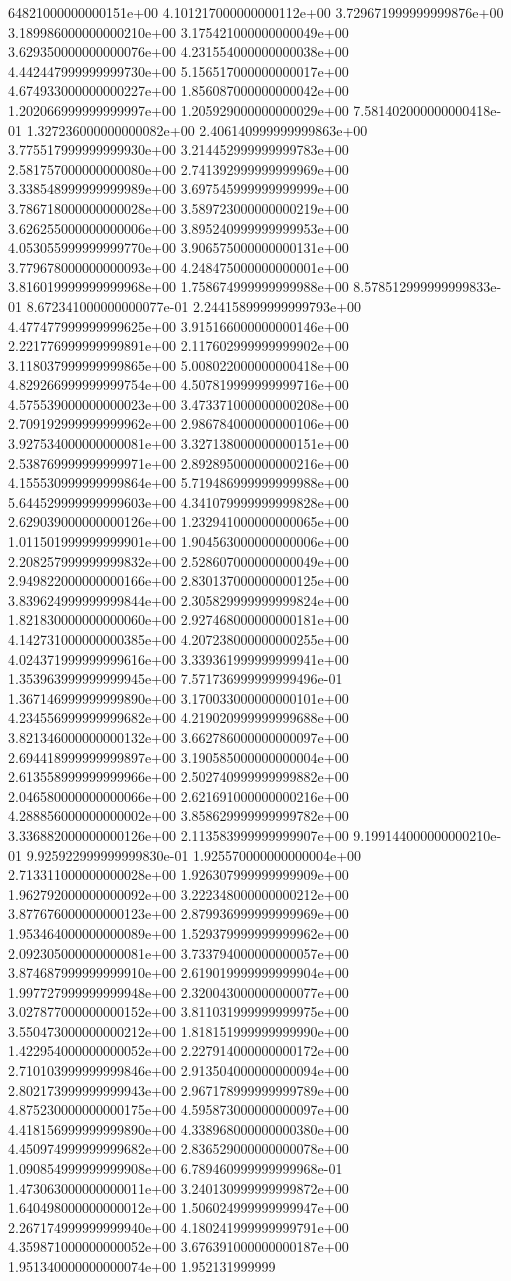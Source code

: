 64821000000000151e+00	4.101217000000000112e+00	3.729671999999999876e+00	3.189986000000000210e+00	3.175421000000000049e+00	3.629350000000000076e+00	4.231554000000000038e+00	4.442447999999999730e+00	5.156517000000000017e+00	4.674933000000000227e+00	1.856087000000000042e+00	1.202066999999999997e+00	1.205929000000000029e+00	7.581402000000000418e-01	1.327236000000000082e+00	2.406140999999999863e+00	3.775517999999999930e+00	3.214452999999999783e+00	2.581757000000000080e+00	2.741392999999999969e+00	3.338548999999999989e+00	3.697545999999999999e+00	3.786718000000000028e+00	3.589723000000000219e+00	3.626255000000000006e+00	3.895240999999999953e+00	4.053055999999999770e+00	3.906575000000000131e+00	3.779678000000000093e+00	4.248475000000000001e+00	3.816019999999999968e+00	1.758674999999999988e+00	8.578512999999999833e-01	8.672341000000000077e-01	2.244158999999999793e+00	4.477477999999999625e+00	3.915166000000000146e+00	2.221776999999999891e+00	2.117602999999999902e+00	3.118037999999999865e+00	5.008022000000000418e+00	4.829266999999999754e+00	4.507819999999999716e+00	4.575539000000000023e+00	3.473371000000000208e+00	2.709192999999999962e+00	2.986784000000000106e+00	3.927534000000000081e+00	3.327138000000000151e+00	2.538769999999999971e+00	2.892895000000000216e+00	4.155530999999999864e+00	5.719486999999999988e+00	5.644529999999999603e+00	4.341079999999999828e+00	2.629039000000000126e+00	1.232941000000000065e+00	1.011501999999999901e+00	1.904563000000000006e+00	2.208257999999999832e+00	2.528607000000000049e+00	2.949822000000000166e+00	2.830137000000000125e+00	3.839624999999999844e+00	2.305829999999999824e+00	1.821830000000000060e+00	2.927468000000000181e+00	4.142731000000000385e+00	4.207238000000000255e+00	4.024371999999999616e+00	3.339361999999999941e+00	1.353963999999999945e+00	7.571736999999999496e-01	1.367146999999999890e+00	3.170033000000000101e+00	4.234556999999999682e+00	4.219020999999999688e+00	3.821346000000000132e+00	3.662786000000000097e+00	2.694418999999999897e+00	3.190585000000000004e+00	2.613558999999999966e+00	2.502740999999999882e+00	2.046580000000000066e+00	2.621691000000000216e+00	4.288856000000000002e+00	3.858629999999999782e+00	3.336882000000000126e+00	2.113583999999999907e+00	9.199144000000000210e-01	9.925922999999999830e-01	1.925570000000000004e+00	2.713311000000000028e+00	1.926307999999999909e+00	1.962792000000000092e+00	3.222348000000000212e+00	3.877676000000000123e+00	2.879936999999999969e+00	1.953464000000000089e+00	1.529379999999999962e+00	2.092305000000000081e+00	3.733794000000000057e+00	3.874687999999999910e+00	2.619019999999999904e+00	1.997727999999999948e+00	2.320043000000000077e+00	3.027877000000000152e+00	3.811031999999999975e+00	3.550473000000000212e+00	1.818151999999999990e+00	1.422954000000000052e+00	2.227914000000000172e+00	2.710103999999999846e+00	2.913504000000000094e+00	2.802173999999999943e+00	2.967178999999999789e+00	4.875230000000000175e+00	4.595873000000000097e+00	4.418156999999999890e+00	4.338968000000000380e+00	4.450974999999999682e+00	2.836529000000000078e+00	1.090854999999999908e+00	6.789460999999999968e-01	1.473063000000000011e+00	3.240130999999999872e+00	1.640498000000000012e+00	1.506024999999999947e+00	2.267174999999999940e+00	4.180241999999999791e+00	4.359871000000000052e+00	3.676391000000000187e+00	1.951340000000000074e+00	1.952131999999